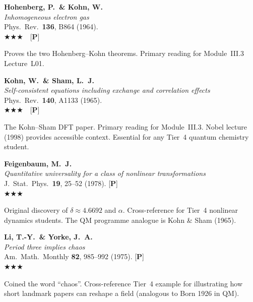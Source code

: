 \documentclass[11pt,a4paper]{article}
\newcommand{\essential}{$\bigstar\bigstar\bigstar$}
\newenvironment{bibentry}[1]{%
  \begin{tcolorbox}[entrybox=#1, top=4pt, bottom=4pt]%
}{%
  \end{tcolorbox}\smallskip%
}
\begin{document}
\begin{bibentry}{t4light}
\textbf{Hohenberg, P.\ \& Kohn, W.}\\
\textit{Inhomogeneous electron gas}\\
Phys.~Rev.~\textbf{136}, B864 (1964).\\[4pt]
\essential\ \ [\textbf{P}]\\[4pt]
\begin{tcolorbox}[annotbox]
Proves the two Hohenberg--Kohn theorems. Primary reading for Module~III.3 Lecture~L01.
\end{tcolorbox}
\end{bibentry}

\begin{bibentry}{t4light}
\textbf{Kohn, W.\ \& Sham, L.~J.}\\
\textit{Self-consistent equations including exchange and correlation effects}\\
Phys.~Rev.~\textbf{140}, A1133 (1965).\\[4pt]
\essential\ \ [\textbf{P}]\\[4pt]
\begin{tcolorbox}[annotbox]
The Kohn--Sham DFT paper. Primary reading for Module~III.3. Nobel lecture (1998)
provides accessible context. Essential for any Tier~4 quantum chemistry student.
\end{tcolorbox}
\end{bibentry}

\begin{bibentry}{t4light}
\textbf{Feigenbaum, M.~J.}\\
\textit{Quantitative universality for a class of nonlinear transformations}\\
J.~Stat.~Phys.~\textbf{19}, 25--52 (1978). [\textbf{P}]\\[4pt]
\essential\\[4pt]
\begin{tcolorbox}[annotbox]
Original discovery of $\delta\approx 4.6692$ and $\alpha$. Cross-reference for
Tier~4 nonlinear dynamics students. The QM programme analogue is Kohn \& Sham (1965).
\end{tcolorbox}
\end{bibentry}

\begin{bibentry}{t4light}
\textbf{Li, T.-Y.\ \& Yorke, J.~A.}\\
\textit{Period three implies chaos}\\
Am.~Math.~Monthly \textbf{82}, 985--992 (1975). [\textbf{P}]\\[4pt]
\essential\\[4pt]
\begin{tcolorbox}[annotbox]
Coined the word ``chaos''. Cross-reference Tier~4 example for illustrating how
short landmark papers can reshape a field (analogous to Born 1926 in QM).
\end{tcolorbox}
\end{bibentry}
\end{document}
